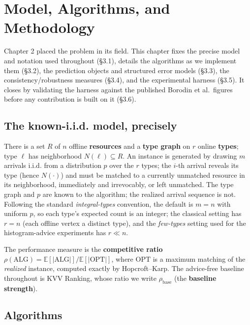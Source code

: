 \chapter{Model, Algorithms, and Methodology}\label{model-algorithms-and-methodology}

Chapter 2 placed the problem in its field. This chapter fixes the precise model and
notation used throughout (§3.1), details the algorithms as we implement them (§3.2), the
prediction objects and structured error models (§3.3), the consistency/robustness measures
(§3.4), and the experimental harness (§3.5). It closes by validating the harness against
the published Borodin et al.~figures before any contribution is built on it (§3.6).

\section{The known-i.i.d. model, precisely}\label{the-known-i.i.d.-model-precisely}

There is a set \(R\) of \(n\) offline \textbf{resources} and a \textbf{type graph} on \(r\) online
\textbf{types}; type \(\ell\) has neighborhood \(N(\ell)\subseteq R\). An instance is generated by
drawing \(m\) arrivals i.i.d. from a distribution \(p\) over the \(r\) types; the \(i\)-th arrival
reveals its type (hence \(N(\cdot)\)) and must be matched to a currently unmatched resource in
its neighborhood, immediately and irrevocably, or left unmatched. The type graph and \(p\) are
known to the algorithm; the realized arrival sequence is not. Following the standard
\emph{integral-types} convention, the default is \(m=n\) with uniform \(p\), so each type's expected
count is an integer; the classical setting has \(r=n\) (each offline vertex a distinct type),
and the \emph{few-types} setting used for the histogram-advice experiments has \(r\ll n\).

The performance measure is the \textbf{competitive ratio} \(\rho(\mathrm{ALG}) =
\mathbb E[|\mathrm{ALG}|]/\mathbb E[|\mathrm{OPT}|]\), where \(\mathrm{OPT}\) is a maximum
matching of the \emph{realized} instance, computed exactly by Hopcroft--Karp. The advice-free
baseline throughout is KVV Ranking, whose ratio we write \(\rho_{\mathrm{base}}\) (the
\textbf{baseline strength}).

\section{Algorithms}\label{algorithms}


